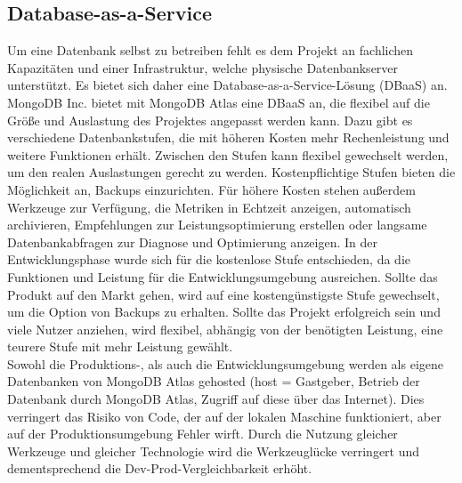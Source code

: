 \subsection{Database-as-a-Service}
Um eine Datenbank selbst zu betreiben fehlt es dem Projekt an fachlichen Kapazitäten und einer Infrastruktur, welche physische Datenbankserver unterstützt.
Es bietet sich daher eine Database-as-a-Service-Lösung (DBaaS) an.\\ 
MongoDB Inc. bietet mit MongoDB Atlas eine DBaaS an, die flexibel auf die Größe und Auslastung des Projektes angepasst werden kann.
Dazu gibt es verschiedene Datenbankstufen, die mit höheren Kosten mehr Rechenleistung und weitere Funktionen erhält.
Zwischen den Stufen kann flexibel gewechselt werden, um den realen Auslastungen gerecht zu werden.
Kostenpflichtige Stufen bieten die Möglichkeit an, Backups einzurichten.
Für höhere Kosten stehen außerdem Werkzeuge zur Verfügung, die Metriken in Echtzeit anzeigen, automatisch archivieren, Empfehlungen zur Leistungsoptimierung erstellen oder langsame Datenbankabfragen zur Diagnose und Optimierung anzeigen.
In der Entwicklungsphase wurde sich für die kostenlose Stufe entschieden, da die Funktionen und Leistung für die Entwicklungsumgebung ausreichen.
Sollte das Produkt auf den Markt gehen, wird auf eine kostengünstigste Stufe gewechselt, um die Option von Backups zu erhalten.
Sollte das Projekt erfolgreich sein und viele Nutzer anziehen, wird flexibel, abhängig von der benötigten Leistung, eine teurere Stufe mit mehr Leistung gewählt.\\
Sowohl die Produktions-, als auch die Entwicklungsumgebung werden als eigene Datenbanken von MongoDB Atlas gehosted (host = Gastgeber, Betrieb der Datenbank durch MongoDB Atlas, Zugriff auf diese über das Internet).
Dies verringert das Risiko von Code, der auf der lokalen Maschine funktioniert, aber auf der Produktionsumgebung Fehler wirft.
Durch die Nutzung gleicher Werkzeuge und gleicher Technologie wird die Werkzeuglücke verringert und dementsprechend die Dev-Prod-Vergleichbarkeit erhöht. \cite{12FA-10}

